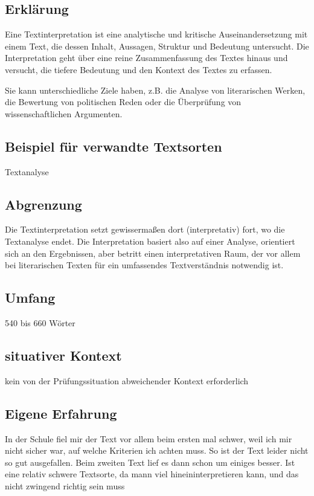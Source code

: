 \subsection{Erklärung}
Eine Textinterpretation ist eine analytische und kritische Auseinandersetzung mit einem Text, die dessen Inhalt, Aussagen, Struktur und Bedeutung untersucht. Die Interpretation geht über eine reine Zusammenfassung des Textes hinaus und versucht, die tiefere Bedeutung und den Kontext des Textes zu erfassen.

Sie kann unterschiedliche Ziele haben, z.B. die Analyse von literarischen Werken, die Bewertung von politischen Reden oder die Überprüfung von wissenschaftlichen Argumenten.
\subsection{Beispiel für verwandte Textsorten} Textanalyse
\subsection{Abgrenzung} Die Textinterpretation setzt gewissermaßen dort (interpretativ) fort,
wo die Textanalyse endet. Die Interpretation basiert also auf einer Analyse, orientiert sich an den Ergebnissen, aber betritt einen interpretativen Raum, der vor allem bei literarischen Texten für ein umfassendes
Textverständnis notwendig ist.

\subsection{Umfang}  540 bis 660 Wörter
\subsection{situativer Kontext} kein von der Prüfungssituation abweichender Kontext erforderlich

\subsection{Eigene Erfahrung}

In der Schule fiel mir der Text vor allem beim ersten mal schwer, weil ich mir nicht sicher war, auf welche Kriterien ich achten muss. So ist der Text leider nicht so gut ausgefallen. Beim zweiten Text lief es dann schon um einiges besser. Ist eine relativ schwere Textsorte, da mann viel hineininterpretieren kann, und das nicht zwingend richtig sein muss